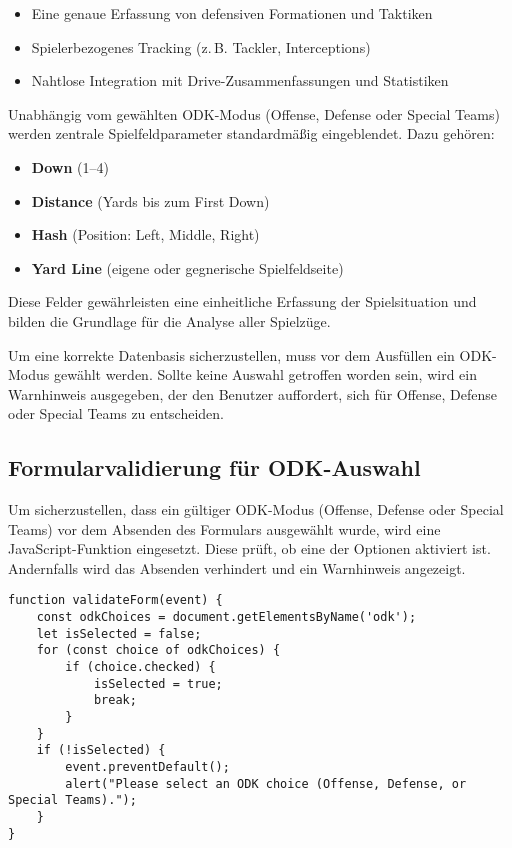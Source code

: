 \begin{itemize}
    \item Eine genaue Erfassung von defensiven Formationen und Taktiken
    \item Spielerbezogenes Tracking (z.\,B. Tackler, Interceptions)
    \item Nahtlose Integration mit Drive-Zusammenfassungen und Statistiken
\end{itemize}

Unabhängig vom gewählten ODK-Modus (Offense, Defense oder Special Teams) werden zentrale Spielfeldparameter standardmäßig eingeblendet. Dazu gehören:

\begin{itemize}
    \item \textbf{Down} (1–4)
    \item \textbf{Distance} (Yards bis zum First Down)
    \item \textbf{Hash} (Position: Left, Middle, Right)
    \item \textbf{Yard Line} (eigene oder gegnerische Spielfeldseite)
\end{itemize}

Diese Felder gewährleisten eine einheitliche Erfassung der Spielsituation und bilden die Grundlage für die Analyse aller Spielzüge.

Um eine korrekte Datenbasis sicherzustellen, muss vor dem Ausfüllen ein ODK-Modus gewählt werden. Sollte keine Auswahl getroffen worden sein, wird ein Warnhinweis ausgegeben, der den Benutzer auffordert, sich für Offense, Defense oder Special Teams zu entscheiden.

\subsection{Formularvalidierung für ODK-Auswahl}

Um sicherzustellen, dass ein gültiger ODK-Modus (Offense, Defense oder Special Teams) vor dem Absenden des Formulars ausgewählt wurde, wird eine JavaScript-Funktion eingesetzt. Diese prüft, ob eine der Optionen aktiviert ist. Andernfalls wird das Absenden verhindert und ein Warnhinweis angezeigt.

\begin{verbatim}
function validateForm(event) {
    const odkChoices = document.getElementsByName('odk');
    let isSelected = false;
    for (const choice of odkChoices) {
        if (choice.checked) {
            isSelected = true;
            break;
        }
    }
    if (!isSelected) {
        event.preventDefault();
        alert("Please select an ODK choice (Offense, Defense, or Special Teams).");
    }
}
\end{verbatim}

